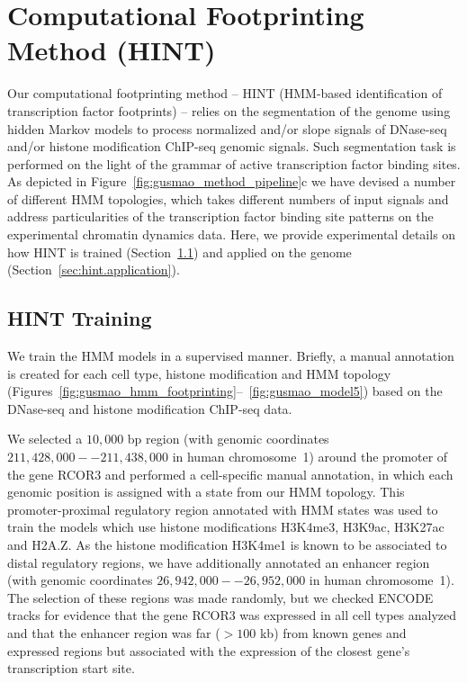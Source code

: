 \section{Computational Footprinting Method (HINT)}
\label{sec:computational.footprinting.method.hint}

Our computational footprinting method -- HINT (HMM-based identification of transcription factor footprints) -- relies on the segmentation of the genome using hidden Markov models to process normalized and/or slope signals of DNase-seq and/or histone modification ChIP-seq genomic signals. Such segmentation task is performed on the light of the grammar of active transcription factor binding sites. As depicted in Figure~\ref{fig:gusmao_method_pipeline}c we have devised a number of different HMM topologies, which takes different numbers of input signals and address particularities of the transcription factor binding site patterns on the experimental chromatin dynamics data. Here, we provide experimental details on how HINT is trained (Section~\ref{sec:hint.training}) and applied on the genome (Section~\ref{sec:hint.application}).

\subsection{HINT Training}
\label{sec:hint.training}

We train the HMM models in a supervised manner. Briefly, a manual annotation is created for each cell type, histone modification and HMM topology (Figures~\ref{fig:gusmao_hmm_footprinting}--~\ref{fig:gusmao_model5}) based on the DNase-seq and histone modification ChIP-seq data.

We selected a $10,000$ bp region (with genomic coordinates $211,428,000--211,438,000$ in human chromosome~1) around the promoter of the gene RCOR3 and performed a cell-specific manual annotation, in which each genomic position is assigned with a state from our HMM topology. This promoter-proximal regulatory region annotated with HMM states was used to train the models which use histone modifications H3K4me3, H3K9ac, H3K27ac and H2A.Z. As the histone modification H3K4me1 is known to be associated to distal regulatory regions, we have additionally annotated an enhancer region (with genomic coordinates $26,942,000--26,952,000$ in human chromosome~1). The selection of these regions was made randomly, but we checked ENCODE~\cite{encode2012} tracks for evidence that the gene RCOR3 was expressed in all cell types analyzed and that the enhancer region was far ($>100$ kb) from known genes and expressed regions but associated with the expression of the closest gene's transcription start site.

